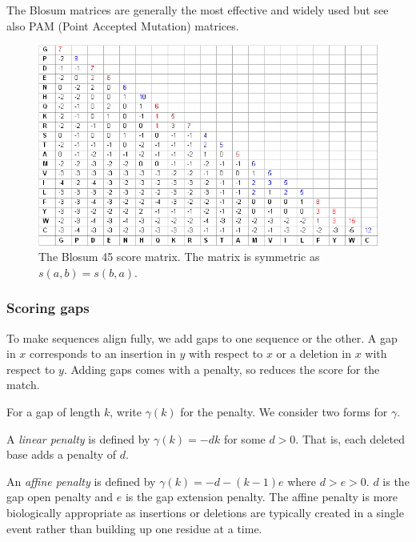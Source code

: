 \documentclass[11pt]{article}
\begin{document}
The Blosum matrices are generally the most effective and widely used but see also PAM  (Point Accepted Mutation) matrices. 


\begin{figure}[hbtp]
\includegraphics[width=14cm]{figures/blosum45}
\caption{The Blosum 45 score matrix.  The matrix is symmetric as $s(a,b) = s(b,a)$.  }
\label{fig:blosum}
\end{figure}



%
%
%
 
\subsubsection{Scoring gaps}

To make sequences align fully, we add gaps to one sequence or the other.  A gap in $x$ corresponds to an insertion in $y$ with respect to $x$ or a deletion in $x$ with respect to $y$.    Adding gaps comes with a penalty, so reduces the score for the match. 

For a gap of length $k$, write  $\gamma(k)$ for the penalty.  We consider two forms for $\gamma$. 

A {\em  linear penalty } is defined by $\gamma(k) = -dk $ for some $d > 0$.  That is, each deleted base adds a penalty of $d$.

 An {\em affine penalty} is defined by $\gamma(k)= -d-(k-1)e$ where $d>e>0$. $d$ is the gap open penalty and $e$ is the gap extension penalty.  The affine penalty is more biologically appropriate as insertions or deletions are typically created in a single event rather than building up one residue at a time. 
 
\end{document}
